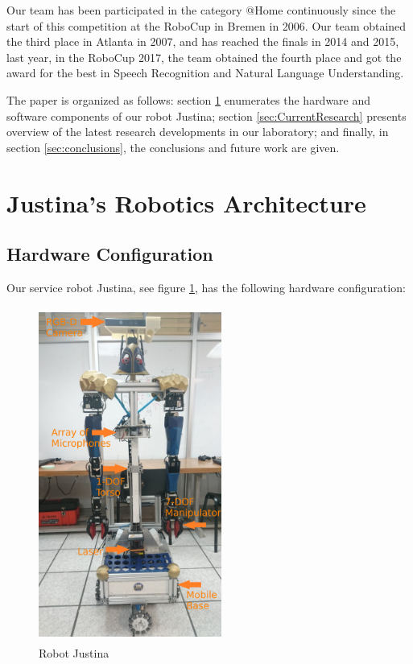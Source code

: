 \documentclass{llncs}
\begin{document}
Our team has been participated in the category @Home continuously since the start of this competition at the RoboCup in Bremen in 2006. Our team obtained the third place in Atlanta in 2007, and has reached the finals in 2014 and 2015, last year, in the RoboCup 2017, the team obtained the fourth place and got the award for the best in Speech Recognition and Natural Language Understanding.

The paper is organized as follows:
section \ref{sec:background} enumerates the hardware and software components of our robot
Justina; section \ref{sec:CurrentResearch}  presents overview of the latest research developments in our
laboratory; and finally, in section \ref{sec:conclusions}, the conclusions and future work are given.


\section{Justina's Robotics Architecture}\label{sec:background}
\subsection{Hardware Configuration}

Our service robot Justina, see figure \ref{fig:justina}, has the following hardware configuration:\\

\begin{figure}
	\includegraphics[angle=0, height=11cm, width=6cm]{Figures/justina_scheme.png}
  \caption{Robot Justina}
  \label{fig:justina}
\end{figure}
\end{document}
